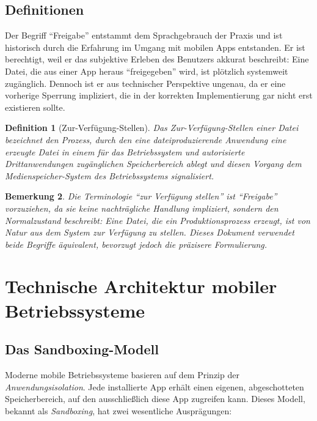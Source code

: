 ﻿\documentclass[12pt, a4paper]{article}
\newtheorem{definition}{Definition}[section]
\newtheorem{bemerkung}[definition]{Bemerkung}
\begin{document}
\subsection{Definitionen}

Der Begriff \enquote{Freigabe} entstammt dem Sprachgebrauch der Praxis und ist historisch
durch die Erfahrung im Umgang mit mobilen Apps entstanden. Er ist berechtigt, weil er
das subjektive Erleben des Benutzers akkurat beschreibt: Eine Datei, die aus einer App
heraus \enquote{freigegeben} wird, ist plötzlich systemweit zugänglich. Dennoch ist
er aus technischer Perspektive ungenau, da er eine vorherige Sperrung impliziert, die
in der korrekten Implementierung gar nicht erst existieren sollte.

\begin{definition}[Zur-Verfügung-Stellen]
\label{def:verfuegbarstellen}
Das \emph{Zur-Verfügung-Stellen} einer Datei bezeichnet den Prozess, durch den eine
dateiproduzierende Anwendung eine erzeugte Datei in einem für das Betriebssystem
und autorisierte Drittanwendungen zugänglichen Speicherbereich ablegt und diesen
Vorgang dem Medienspeicher-System des Betriebssystems signalisiert.
\end{definition}

\begin{bemerkung}
Die Terminologie \enquote{zur Verfügung stellen} ist \enquote{Freigabe} vorzuziehen,
da sie keine nachträgliche Handlung impliziert, sondern den Normalzustand beschreibt:
Eine Datei, die ein Produktionsprozess erzeugt, ist \emph{von Natur aus} dem System
zur Verfügung zu stellen. Dieses Dokument verwendet beide Begriffe äquivalent,
bevorzugt jedoch die präzisere Formulierung.
\end{bemerkung}

\section{Technische Architektur mobiler Betriebssysteme}
\label{sec:architektur}

\subsection{Das Sandboxing-Modell}

Moderne mobile Betriebssysteme basieren auf dem Prinzip der \emph{Anwendungsisolation}.
Jede installierte App erhält einen eigenen, abgeschotteten Speicherbereich, auf den
ausschließlich diese App zugreifen kann. Dieses Modell, bekannt als \emph{Sandboxing},
hat zwei wesentliche Ausprägungen:
\end{document}
